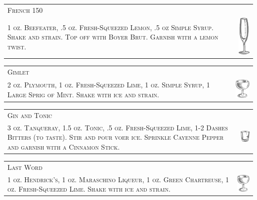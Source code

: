\documentclass{article}
\begin{document}
\begin{tabular}{b{2.5in} m{0.625in}}
  \multicolumn{2}{p{3.0in}}{\centering\Huge\textsc{French 150}} \\ 
  \textsc{1 oz. Beefeater, .5 oz. Fresh-Squeezed Lemon, .5 oz
  Simple Syrup. Shake and strain. Top off with Boyer Brut.
  Garnish with a lemon twist.} &
  \includegraphics[width=0.5in]{flute.png}
\end{tabular}

\begin{tabular}{b{2.5in} m{0.625in}}
  \multicolumn{2}{p{3.0in}}{\centering\Huge\textsc{Gimlet}} \\ 
  \textsc{2 oz. Plymouth, 1 oz. Fresh-Squeezed Lime, 1 oz. Simple
  Syrup, 1 Large Sprig of Mint. Shake with ice and strain.} &
  \includegraphics[width=0.5in]{coupe.png}
\end{tabular}

\begin{tabular}{b{2.5in} m{0.625in}}
  \multicolumn{2}{p{3.0in}}{\centering\Huge\textsc{Gin and Tonic}} \\ 
  \textsc{3 oz. Tanqueray, 1.5 oz. Tonic, .5 oz. Fresh-Squeezed Lime, 1-2
  Dashes Bitters (to taste). Stir and pour voer ice. Sprinkle Cayenne
  Pepper and garnish with a Cinnamon Stick.} &
  \includegraphics[width=0.5in]{rocks_glass.png}
\end{tabular}

\begin{tabular}{b{2.5in} m{0.625in}}
  \multicolumn{2}{p{3.0in}}{\centering\Huge\textsc{Last Word}} \\ 
  \textsc{1 oz. Hendrick's, 1 oz. Maraschino Liqueur, 1 oz. Green
  Chartreuse, 1 oz. Fresh-Squeezed Lime. Shake with ice and strain.} &
  \includegraphics[width=0.5in]{coupe.png}
\end{tabular}
\end{document}
